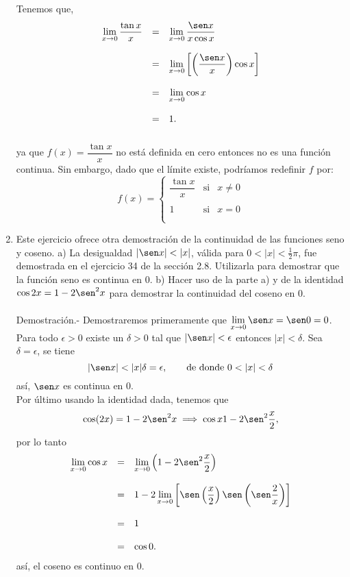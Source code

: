 \begin{enumerate}[\bfseries 1.]
	    Tenemos que,
	    $$\begin{array}{rcl}
		\lim\limits_{x\to 0}\dfrac{\tan x}{x}&=&\lim\limits_{x\to 0}\dfrac{\sen x}{x\cos x}\\\\
						     &=&\lim\limits_{x\to 0}\left[\left(\dfrac{\sen x}{x} \right)\cos x\right]\\\\
						     &=&\lim\limits_{x\to 0}\cos x\\\\
						     &=&1.\\\\
	    \end{array}$$
	    ya que $f(x)=\dfrac{\tan x}{x}$ no está definida en cero entonces no es una función continua. Sin embargo, dado que el límite existe, podríamos redefinir $f$ por:
	    $$f(x)=\left\{\begin{array}{rcl}
		\dfrac{\tan x}{x}&\mbox{si}&x\neq 0\\\\
		1&\mbox{si}&x = 0\\\\
	    \end{array}\right.$$
	    \vspace{.5cm}

	\item Este ejercicio ofrece otra demostración de la continuidad de las funciones seno y coseno. a) La desigualdad $|\sen x|<|x|$, válida para $0<|x|<\frac{1}{2}\pi$, fue demostrada en el ejercicio 34 de la sección 2.8. Utilizarla para demostrar que la función seno es continua en $0$. b) Hacer uso de la parte a) y de la identidad $\cos 2x = 1-2\sen^2 x$ para demostrar la continuidad del coseno en $0$.\\\\
	    Demostración.-\; Demostraremos primeramente que $\lim\limits_{x\to 0}\sen x = \sen 0 = 0$.\\
	    Para todo $\epsilon>0$ existe un $\delta >0$ tal que $|\sen x|<\epsilon$ entonces $|x|<\delta$. Sea $\delta = \epsilon$, se tiene
	    $$|\sen x|<|x|\delta = \epsilon,\qquad \mbox{de donde }0<|x|<\delta$$
	    así, $\sen x$ es continua en $0$.\\
	    Por último usando la identidad dada, tenemos que
	    $$\cos(2x)=1-2\sen^2 x\; \Longrightarrow \; \cos x  1-2\sen^2\dfrac{x}{2},$$
	    por lo tanto
	    $$\begin{array}{rcl}
		\lim\limits_{x\to 0}\cos x&=&\lim\limits_{x\to 0}\left(1-2\sen^2\dfrac{x}{2}\right)\\\\
					  &=&1-2\lim\limits_{x\to 0}\left[\sen\left(\dfrac{x}{2}\right)\sen \left(\sen \dfrac{2}{x}\right)\right]\\\\
					  &=&1\\\\
					  &=&\cos 0.
	    \end{array}$$
	    así, el coseno es continuo en $0$.\\\\


\end{enumerate}
